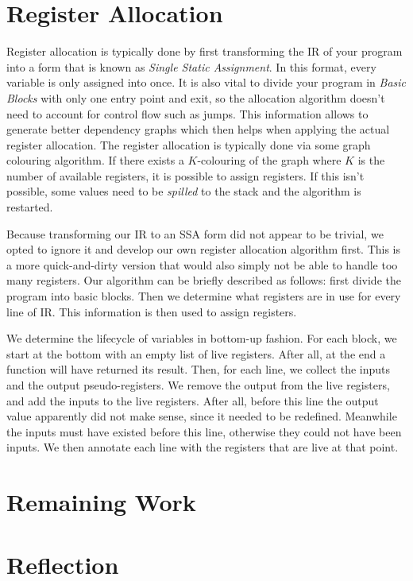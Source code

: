 \section{Register Allocation}

Register allocation is typically done by first transforming the IR of your program into a form that is known as \emph{Single Static Assignment}.
In this format, every variable is only assigned into once.
It is also vital to divide your program in \emph{Basic Blocks} with only one entry point and exit, so the allocation algorithm doesn't need to account for control flow such as jumps.
This information allows to generate better dependency graphs which then helps when applying the actual register allocation.
The register allocation is typically done via some graph colouring algorithm.
If there exists a $K$-colouring of the graph where $K$ is the number of available registers, it is possible to assign registers.
If this isn't possible, some values need to be \emph{spilled} to the stack and the algorithm is restarted.

Because transforming our IR to an SSA form did not appear to be trivial, we opted to ignore it and develop our own register allocation algorithm first.
This is a more quick-and-dirty version that would also simply not be able to handle too many registers.
Our algorithm can be briefly described as follows: first divide the program into basic blocks.
Then we determine what registers are in use for every line of IR\@.
This information is then used to assign registers.

We determine the lifecycle of variables in bottom-up fashion.
For each block, we start at the bottom with an empty list of live registers.
After all, at the end a function will have returned its result.
Then, for each line, we collect the inputs and the output pseudo-registers.
We remove the output from the live registers, and add the inputs to the live registers.
After all, before this line the output value apparently did not make sense, since it needed to be redefined.
Meanwhile the inputs must have existed before this line, otherwise they could not have been inputs.
We then annotate each line with the registers that are live at that point.


\section{Remaining Work}

\section{Reflection}

